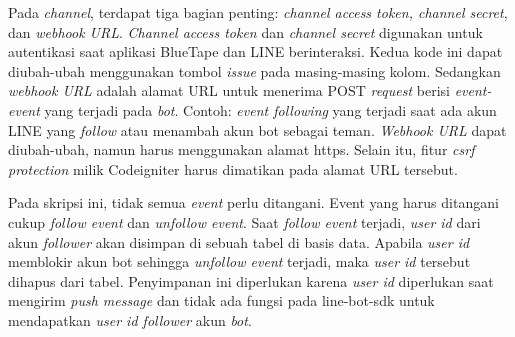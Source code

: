 	Pada \textit{channel}, terdapat tiga bagian penting: \textit{channel access token, channel secret}, dan \textit{webhook URL}. \textit{Channel access token} dan \textit{channel secret} digunakan untuk autentikasi saat aplikasi BlueTape dan LINE berinteraksi. Kedua kode ini dapat diubah-ubah menggunakan tombol \textit{issue} pada masing-masing kolom. Sedangkan \textit{webhook URL} adalah alamat URL untuk menerima POST \textit{request} berisi \textit{event-event} yang terjadi pada \textit{bot}. Contoh: \textit{event following} yang terjadi saat ada akun LINE yang \textit{follow} atau menambah akun bot sebagai teman. \textit{Webhook URL} dapat diubah-ubah, namun harus menggunakan alamat https. Selain itu, fitur \textit{csrf protection} milik Codeigniter harus dimatikan pada alamat URL tersebut.
	
	Pada skripsi ini, tidak semua \textit{event} perlu ditangani. Event yang harus ditangani cukup \textit{follow event} dan \textit{unfollow event}. Saat \textit{follow event} terjadi, \textit{user id} dari akun \textit{follower} akan disimpan di sebuah tabel di basis data. Apabila \textit{user id} memblokir akun bot sehingga \textit{unfollow event} terjadi, maka \textit{user id} tersebut dihapus dari tabel. Penyimpanan ini diperlukan karena \textit{user id} diperlukan saat mengirim \textit{push message} dan tidak ada fungsi pada line-bot-sdk untuk mendapatkan \textit{user id follower} akun \textit{bot}.